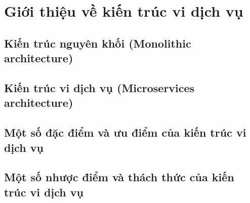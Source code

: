 \documentclass{report} %
\begin{document}
% 
% 
% 
% 

% 

\chapter{Giới thiệu về kiến trúc vi dịch vụ}


 
\section{Kiến trúc nguyên khối (Monolithic architecture)}
% 
\section{Kiến trúc vi dịch vụ (Microservices architecture)}
% 
\section{Một số đặc điểm và ưu điểm của kiến trúc vi dịch vụ}
% 
\section{Một số nhược điểm và thách thức của kiến trúc vi dịch vụ}
% 
\end{document}
